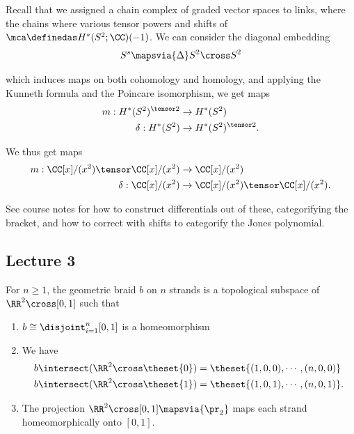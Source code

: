 Recall that we assigned a chain complex of graded vector spaces to
links, where the chains where various tensor powers and shifts of
\(\mca \definedas H^*(S^2; \CC)(-1)\). We can consider the diagonal
embedding
\begin{align*}
S^s \mapsvia{\Delta} S^2 \cross S^2
\end{align*}

which induces maps on both cohomology and homology, and applying the
Kunneth formula and the Poincare isomorphism, we get maps
\begin{align*}
m:      H^*(S^2)^{\tensor 2} &\to H^*(S^2) \\
\delta: H^*(S^2) &\to H^*(S^2)^{\tensor 2}
.\end{align*}

We thus get maps
\begin{align*}
m:        \CC[x]/(x^2) \tensor \CC[x]/(x^2) &\to \CC[x]/(x^2) \\
\delta:   \CC[x]/(x^2) &\to \CC[x]/(x^2) \tensor \CC[x]/(x^2)
.\end{align*}

See course notes for how to construct differentials out of these,
categorifying the bracket, and how to correct with shifts to categorify
the Jones polynomial.

\hypertarget{lecture-3}{%
\subsection{Lecture 3}\label{lecture-3}}

\begin{definition}

For \(n\geq 1\), the geometric braid \(b\) on \(n\) strands is a
topological subspace of \(\RR^2 \cross [0, 1]\) such that

\begin{enumerate}
\def\labelenumi{\alph{enumi}.}
\tightlist
\item
  \(b \cong \disjoint_{i=1}^n [0, 1]\) is a homeomorphism
\item
  We have
  \begin{align*}
    b\intersect (\RR^2 \cross \theset{0}) &= \theset{(1,0,0), \cdots, (n,0,0)} \\
    b\intersect (\RR^2 \cross \theset{1}) &= \theset{(1,0,1), \cdots, (n,0,1)}
    .\end{align*}
\item
  The projection \(\RR^2 \cross [0, 1] \mapsvia{\pr_2}\) maps each
  strand homeomorphically onto \([0, 1]\).
\end{enumerate}

\end{definition}

